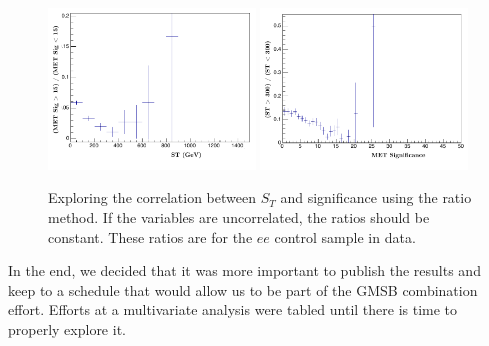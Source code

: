 \begin{figure}[h]
\begin{center}
\includegraphics[width=0.49\textwidth]{Figures/Appendix/kappa1.pdf}
\includegraphics[width=0.49\textwidth]{Figures/Appendix/kappa2.pdf}
\end{center}
\caption{Exploring the correlation between $S_T$ and \ETmiss significance using
the ratio method. If the variables are uncorrelated, the ratios should be constant. These
ratios are for the $ee$ control sample in data.}
\label{fig:kappa}
\end{figure}

In the end, we decided that it was more important to publish the results and keep to 
a schedule that would allow us to be part of the GMSB combination effort. Efforts at a 
multivariate analysis were tabled until there is time to properly explore it.


